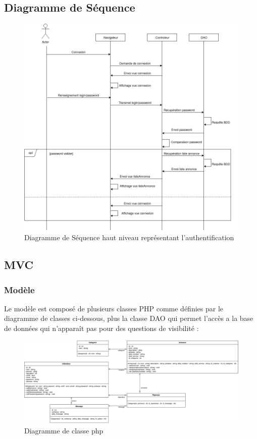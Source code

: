 \documentclass[a4paper,11pt]{article}
\begin{document}
\subsection{Diagramme de Séquence}

\begin{figure}[H]
  \includegraphics[width=\linewidth]{../Conception/DS_Connexion.png}
  \caption{Diagramme de Séquence haut niveau représentant l'authentification}
  \label{fig:<un-label-court>}
\end{figure}



\subsection{MVC}
\subsubsection{Modèle}
Le modèle est composé de plusieurs classes PHP comme définies par le diagramme de classes ci-dessous,
plus la classe DAO qui permet l'accès a la base de données qui n'apparaît pas pour des questions de visibilité :\\

\begin{figure}[H]
  \includegraphics[width=\linewidth]{../Conception/PHP/DC.png}
  \caption{Diagramme de classe php}
  \label{fig:<un-label-court>}
\end{figure}
\end{document}
